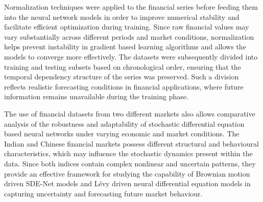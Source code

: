 Normalization techniques were applied to the financial series before feeding them into the neural network models in order to improve numerical stability and facilitate efficient optimization during training. Since raw financial values may vary substantially across different periods and market conditions, normalization helps prevent instability in gradient based learning algorithms and allows the models to converge more effectively. The datasets were subsequently divided into training and testing subsets based on chronological order, ensuring that the temporal dependency structure of the series was preserved. Such a division reflects realistic forecasting conditions in financial applications, where future information remains unavailable during the training phase.

The use of financial datasets from two different markets also allows comparative analysis of the robustness and adaptability of stochastic differential equation based neural networks under varying economic and market conditions. The Indian and Chinese financial markets possess different structural and behavioural characteristics, which may influence the stochastic dynamics present within the data. Since both indices contain complex nonlinear and uncertain patterns, they provide an effective framework for studying the capability of Brownian motion driven SDE-Net models and Lévy driven neural differential equation models in capturing uncertainty and forecasting future market behaviour.